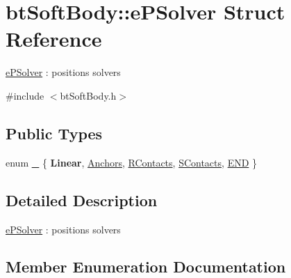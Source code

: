 \hypertarget{structbtSoftBody_1_1ePSolver}{}\section{bt\+Soft\+Body\+:\+:e\+P\+Solver Struct Reference}
\label{structbtSoftBody_1_1ePSolver}


\hyperlink{structbtSoftBody_1_1ePSolver}{e\+P\+Solver} \+: positions solvers  




{\ttfamily \#include $<$bt\+Soft\+Body.\+h$>$}

\subsection*{Public Types}
\begin{DoxyCompactItemize}
\item 
enum \hyperlink{structbtSoftBody_1_1ePSolver_a5d6ab41a09da7333bc2047b4ea14bf86}{\+\_\+} \{ \newline
{\bfseries Linear}, 
\hyperlink{structbtSoftBody_1_1ePSolver_a5d6ab41a09da7333bc2047b4ea14bf86ad1de203597e3f891a95c3aaf4f805e84}{Anchors}, 
\hyperlink{structbtSoftBody_1_1ePSolver_a5d6ab41a09da7333bc2047b4ea14bf86a18826149c80118f73e906b4966c69891}{R\+Contacts}, 
\hyperlink{structbtSoftBody_1_1ePSolver_a5d6ab41a09da7333bc2047b4ea14bf86a1ff50fff0983fbc2e4ae19997d7bfb4e}{S\+Contacts}, 
\newline
\hyperlink{structbtSoftBody_1_1ePSolver_a5d6ab41a09da7333bc2047b4ea14bf86af5b5c91f8cb6d3d29ee7bb11e1ce5610}{E\+ND}
 \}
\end{DoxyCompactItemize}


\subsection{Detailed Description}
\hyperlink{structbtSoftBody_1_1ePSolver}{e\+P\+Solver} \+: positions solvers 

\subsection{Member Enumeration Documentation}
\mbox{\label{structbtSoftBody_1_1ePSolver_a5d6ab41a09da7333bc2047b4ea14bf86}} 
